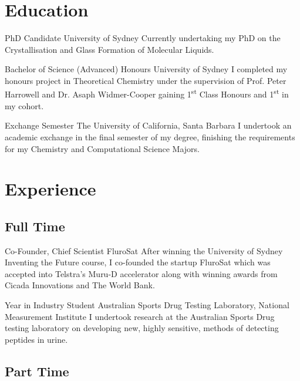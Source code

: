 



\makecvtitle

\section{Education}

{PhD Candidate}
{University of Sydney}{}{}
{Currently undertaking my PhD on the Crystallisation and Glass Formation of Molecular Liquids.}

{Bachelor of Science (Advanced) Honours}
{University of Sydney}{}{}
{I completed my honours project in Theoretical Chemistry under the supervision of Prof. Peter Harrowell and Dr. Asaph Widmer-Cooper gaining 1\textsuperscript{st} Class Honours and 1\textsuperscript{st} in my cohort.}

{Exchange Semester}
{The University of California, Santa Barbara}{}{}
{I undertook an academic exchange in the final semester of my degree, finishing the requirements for my Chemistry and Computational Science Majors.}

\nocite{*}
\printbibliography[title={Publications}]

\section{Experience}

\subsection{Full Time}

{Co-Founder, Chief Scientist}
{FluroSat}{}{}
{After winning the University of Sydney Inventing the Future course, 
I co-founded the startup FluroSat which was accepted into Telstra's Muru-D accelerator
along with winning awards from Cicada Innovations and The World Bank.}

{Year in Industry Student}
{Australian Sports Drug Testing Laboratory, National Measurement Institute}
{}{}
{I undertook research at the Australian Sports Drug testing laboratory on developing new, highly sensitive, methods of detecting peptides in urine.}

\subsection{Part Time}

